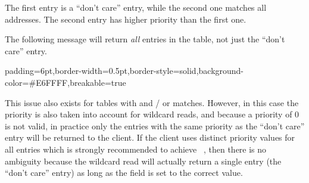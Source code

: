 \documentclass[11pt]{article}
\begin{document}
{%
\noindent{}The first entry is a \textquotedblleft{}don't care\textquotedblright{} entry, while the second one matches all
 addresses. The second entry has higher priority than the first one.%

The following  message will return \emph{all} entries in the table, not
just the \textquotedblleft{}don't care\textquotedblright{} entry.%

\begin{mdbmargintb}{6pt}{6pt}%
\begin{mdblock}{padding=6pt,border-width=0.5pt,border-style=solid,background-color=\#E6FFFF,breakable=true}%
\begin{mdpre}%
\end{mdpre}%
\end{mdblock}%
\end{mdbmargintb}%

\noindent{}This issue also exists for tables with  and / or 
matches. However, in this case the priority is also taken into account for
wildcard reads, and because a priority of 0 is not valid, in practice only the
entries with the same priority as the \textquotedblleft{}don't care\textquotedblright{} entry will be returned to the
client. If the client uses distinct priority values for all entries \textemdash{} which is
strongly recommended to achieve~ \textemdash{},
then there is no ambiguity because the wildcard read will actually return a
single entry (the \textquotedblleft{}don't care\textquotedblright{} entry) as long as the  field is set to
the correct value.%

}
\end{document}
